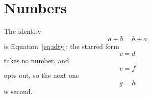 \documentclass{article}
\begin{document}
\section{Numbers}
The identity
\begin{equation}
  \label{eq:idty}
  a + b = b + a
\end{equation}
is Equation~\eqref{eq:idty}; the starred form
\begin{equation*}
  c = d
\end{equation*}
takes no number, and
\begin{equation}
  e = f \nonumber
\end{equation}
opts out, so the next one
\begin{equation}
  g = h
\end{equation}
is second.
\end{document}
